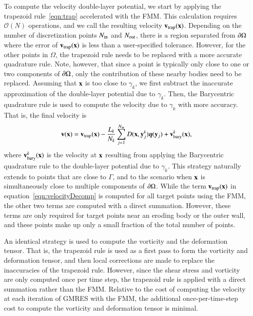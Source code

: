 \documentclass[preprint, 10pt]{elsarticle}
\begin{document}
To compute the velocity double-layer potential, we start by applying the
trapezoid rule~\eqref{eqn:trap} accelerated with the FMM.  This
calculation requires $\mathcal{O}(N)$ operations, and we call the
resulting velocity ${\mathbf{v}}_{\mathrm{trap}}({\mathbf{x}})$.  Depending on the number of
discretization points $N_{\mathrm{in}}$ and $N_{\mathrm{out}}$, there is a region separated
from ${\partial}\Omega$ where the error of ${\mathbf{v}}_{\mathrm{trap}}({\mathbf{x}})$ is less than a
user-specified tolerance.  However, for the other points in $\Omega$,
the trapezoid rule needs to be replaced with a more accurate quadrature
rule.  Note, however, that since a point is typically only close to one
or two components of ${\partial}\Omega$, only the contribution of these nearby
bodies need to be replaced.  Assuming that ${\mathbf{x}}$ is too close to
$\gamma_k$, we first subtract the inaccurate approximation of the
double-layer potential due to $\gamma_k$.  Then, the Barycentric
quadrature rule is used to compute the velocity due to $\gamma_k$ with
more accuracy.  That is, the final velocity is
\begin{align}
  {\mathbf{v}}({\mathbf{x}}) = {\mathbf{v}}_{\mathrm{trap}}({\mathbf{x}}) - \frac{L_k}{N_k} \sum_{j=1}^{N_{\mathrm{in}}} 
    D({\mathbf{x}},{\mathbf{y}}^k_j) {\boldsymbol\eta}({\mathbf{y}}_j) + {\mathbf{v}}^k_{\mathrm{bary}}({\mathbf{x}}),
  \label{eqn:velocityDecomp}
\end{align}
where ${\mathbf{v}}^k_{\mathrm{bary}}({\mathbf{x}})$ is the velocity at ${\mathbf{x}}$ resulting from
applying the Barycentric quadrature rule to the double-layer potential
due to $\gamma_k$.  This strategy naturally extends to points that are
close to $\Gamma$, and to the scenario when ${\mathbf{x}}$ is simultaneously
close to multiple components of ${\partial}\Omega$.  While the term
${\mathbf{v}}_{\mathrm{trap}}({\mathbf{x}})$ in equation~\eqref{eqn:velocityDecomp} is computed for
all target points using the FMM, the other two terms are computed with a
direct summation.  However, these terms are only required for target
points near an eroding body or the outer wall, and these points make up
only a small fraction of the total number of points.  

An identical strategy is used to compute the vorticity and the
deformation tensor.  That is, the trapezoid rule is used as a first pass
to form the vorticity and deformation tensor, and then local corrections
are made to replace the inaccuracies of the trapezoid rule.  However,
since the shear stress and vorticity are only computed once per time
step, the trapezoid rule is applied with a direct summation rather than
the FMM.  Relative to the cost of computing the velocity at each
iteration of GMRES with the FMM, the additional once-per-time-step cost
to compute the vorticity and deformation tensor is minimal.
\end{document}
